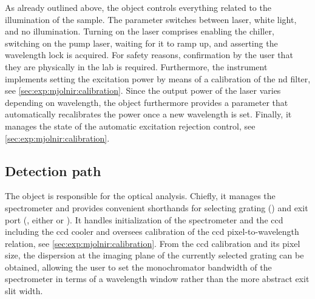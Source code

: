 As already outlined above, the  object controls everything related to the illumination of the sample.
The  parameter switches between laser, white light, and no illumination.
Turning on the laser comprises enabling the chiller, switching on the pump laser, waiting for it to ramp up, and asserting the wavelength lock is acquired.
For safety reasons, confirmation by the user that they are physically in the lab is required.
Furthermore, the  instrument implements setting the excitation power by means of a calibration of the \gls{nd} filter, see \cref{sec:exp:mjolnir:calibration}.
Since the output power of the laser varies depending on wavelength, the object furthermore provides a  parameter that automatically recalibrates the power once a new wavelength is set.
Finally, it manages the state of the automatic excitation rejection control, see \cref{sec:exp:mjolnir:calibration}.

\subsection{Detection path}\label{subsec:exp:mjolnir:logical_instruments:det}
The  object is responsible for the optical analysis.
Chiefly, it manages the \thespectrometer spectrometer and provides convenient shorthands for selecting grating () and exit port (, either  or ).
It handles initialization of the spectrometer and the \gls{ccd} including the \gls{ccd} cooler and oversees calibration of the \gls{ccd} pixel-to-wavelength relation, see \cref{sec:exp:mjolnir:calibration}.
From the \gls{ccd} calibration and its pixel size, the dispersion at the imaging plane of the currently selected grating can be obtained, allowing the user to set the monochromator bandwidth of the spectrometer in terms of a wavelength window rather than the more abstract exit slit width.

